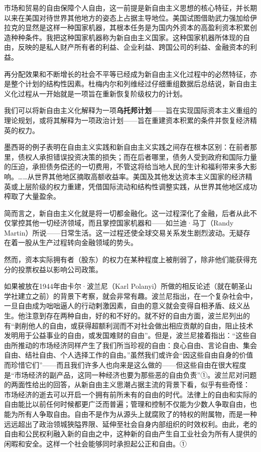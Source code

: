 
市场和贸易的自由保障个人自由，这一前提是新自由主义思想的核心特征，并长期以来在美国对待世界其他地方的姿态上占据主导地位。美国试图借助武力强加给伊拉克的显然是这样一种国家机器，其根本任务是为国内外资本的高盈利资本积累创造种种条件。我把这种国家机器称为新自由主义国家。这种国家机器所体现的自由，反映的是私人财产所有者的利益、企业利益、跨国公司的利益、金融资本的利益。

再分配效果和不断增长的社会不平等已经成为新自由主义化过程中的必然特征，亦是整个计划的结构性因素。杜梅内尔和列维经过仔细重组数据后总结说，新自由主义化过程从一开始就是一项旨在重新恢复阶级权力的计划。

我们可以将新自由主义化解释为一项\textbf{乌托邦计划}——旨在实现国际资本主义重组的理论规划，或将其解释为一项政治计划——旨在重建资本积累的条件并恢复经济精英的权力。

墨西哥的例子表明在自由主义实践和新自由主义实践之间存在根本区别：在前者那里，债权人承担错误投资决策的损失；而在后者哪里，债务人受到政府和国际力量的压迫，承担债务偿还的一切费用，不管这将给当地人民的生计和福利带来多大影响。……从世界其他地区摘取高额收益率。美国及其他发达资本主义国家的经济精英或上层阶级的权力重建，凭借国际流动和结构性调整实践，从世界其他地区成功榨取了大量盈余。

简而言之，新自由主义化就是将一切都金融化。这一过程深化了金融，后者从此不仅掌控其他一切经济领域，而且掌控国家机器和——如兰迪·马丁（Randy Martin）所说——日常生活。这一过程还使全球交易关系发生剧烈波动。无疑存在着一股从生产过程转向金融领域的势头。

然而，资本实际拥有者（股东）的权力在某种程度上被削弱了，除非他们能获得充分的投票权益以影响公司政策。

如果被放在1944年由卡尔·波兰尼（Karl Polanyi）所做的相反论述（就在朝圣山学社建立之前）的背景下考察，就会非常有趣。波兰尼指出，在一个复杂社会中，一旦自由成为咄咄逼人的行动剌激因素，自由的意义就会变得自相矛盾、歧义丛生。他注意到存在两种自由，好的和不好的。就不好的自由方面，波兰尼列出的有“剥削他人的自由，或获得超额利润而不对社会做出相应贡献的自由，阻止技术发明用于公益事业的自由，或发国难财的自由”。但是，波兰尼接着指出：“这些自由所推动的市场经济同样产生了我们所当珍视的自由：良心自由、言论自由、集会自由、结社自由、个人选择工作的自由。”虽然我们或许会“因这些自由自身的价值而珍惜它们”——而且我们许多人也向来是这么做的——但这些自由在很大程度是“市场经济的副产品，这同一种经济也要为那些恶的自由负责”①。波兰尼对问题的两面性给出的回答，从新自由主义思潮占据主流的背景下看，似乎有些奇怪：　市场经济的逝去可以开启一个拥有前所未有的自由的时代。法律上的自由和实际的自由能比以前任何时候都更广泛而普遍；管理和控制不仅能为少数人争取自由，也能为所有人争取自由。自由不是作为从源头上就腐败了的特权的附属物，而是一种远远超出了政治领城狹隘界限、延伸至社会自身内部组织的时效权利。由此，老的自由和公民权利融入新的自由之中，这种新的自由产生自工业社会为所有人提供的闲暇和安全。这样一个社会能够同时承担起公正和自由。①

